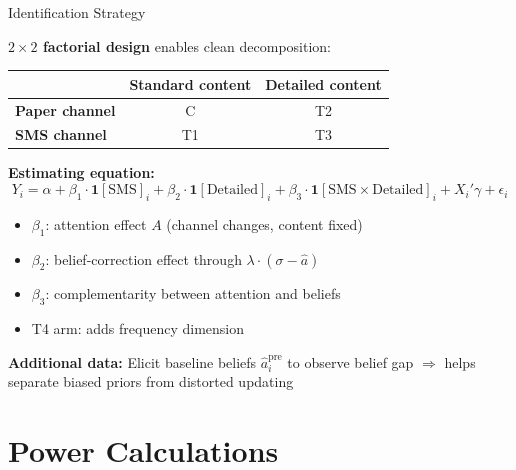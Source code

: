\documentclass[aspectratio=169,11pt]{beamer}
\begin{document}
\begin{frame}{Identification Strategy}

\textbf{$2 \times 2$ factorial design} enables clean decomposition:

\bigskip

\begin{table}[h]
\centering
\begin{tabular}{@{}lcc@{}}
\toprule
 & \textbf{Standard content} & \textbf{Detailed content} \\
\midrule
\textbf{Paper channel} & C & T2 \\
\textbf{SMS channel}   & T1 & T3 \\
\bottomrule
\end{tabular}
\end{table}

\bigskip

\textbf{Estimating equation:}
\[
Y_i = \alpha + \beta_1 \cdot \mathbf{1}[\text{SMS}]_i + \beta_2 \cdot \mathbf{1}[\text{Detailed}]_i + \beta_3 \cdot \mathbf{1}[\text{SMS} \times \text{Detailed}]_i + X_i'\gamma + \epsilon_i
\]

\begin{itemize}
    \item $\beta_1$: attention effect $A$ (channel changes, content fixed)
    \item $\beta_2$: belief-correction effect through $\lambda \cdot (\sigma - \hat{a})$
    \item $\beta_3$: complementarity between attention and beliefs
    \item T4 arm: adds frequency dimension
\end{itemize}

\bigskip

\textbf{Additional data:} Elicit baseline beliefs $\hat{a}_i^{\text{pre}}$ to observe belief gap $\Rightarrow$ helps separate biased priors from distorted updating

\end{frame}

\section{Power Calculations}
\end{document}
